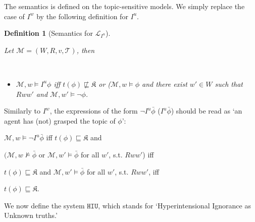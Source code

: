 \documentclass{article}
\newtheorem{defi}{Definition}
\begin{document}
The semantics is defined on the topic-sensitive models. We simply replace the case of $I^{w}$ by the following definition for $I^{u}$.

\begin{defi}[Semantics for $\mathcal{L}_{I^{u}}$]
\label{HIUdefi}

Let $\mathcal{M} = (W, R, v, \mathcal{T})$, then

\

\begin{itemize}

\item $\mathcal{M}, w \models I^{u} \phi$ iff $t(\phi) \not \sqsubseteq \mathfrak{K}$ or ($\mathcal{M}, w \models \phi$ and there exist $w' \in W$ such that $Rww'$ and $\mathcal{M}, w' \models \neg \phi$.

\end{itemize}

\end{defi}

Similarly to $I^{w}$, the expressions of the form $\neg I^{u} \bar{\phi}$ ($I^{u} \bar{\phi}$) should be read as `an agent has (not) grasped the topic of $\phi$':

\begin{center}

$\mathcal{M}, w \models \neg I^{u} \bar{\phi}$ iff $t(\phi) \sqsubseteq \mathfrak{K}$ and

$(\mathcal{M}, w \not \models \bar{\phi}$ or $\mathcal{M}, w' \models \bar{\phi}$ for all $w'$, s.t. $Rww'$) iff

$t(\phi) \sqsubseteq \mathfrak{K}$ and $\mathcal{M}, w' \models \bar{\phi}$ for all $w'$, s.t. $Rww'$, iff

$t(\phi) \sqsubseteq \mathfrak{K}$.

\end{center}

We now define the system $\mathtt{HIU}$, which stands for `Hyperintensional Ignorance as Unknown truths.'
\end{document}
